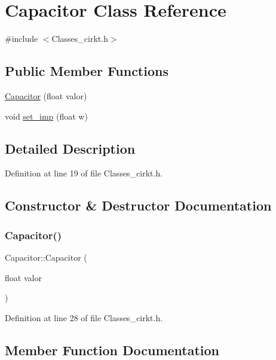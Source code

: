 \hypertarget{class_capacitor}{}\section{Capacitor Class Reference}
\label{class_capacitor}


{\ttfamily \#include $<$Classes\+\_\+cirkt.\+h$>$}

\subsection*{Public Member Functions}
\begin{DoxyCompactItemize}
\item 
\mbox{\hyperlink{class_capacitor_aedcd2e6ce4a36341c227730c49e6bd9a}{Capacitor}} (float valor)
\item 
void \mbox{\hyperlink{class_capacitor_a8a7b6a7f3735d80592111a96e590a771}{set\+\_\+imp}} (float w)
\end{DoxyCompactItemize}


\subsection{Detailed Description}


Definition at line 19 of file Classes\+\_\+cirkt.\+h.



\subsection{Constructor \& Destructor Documentation}
\mbox{\label{class_capacitor_aedcd2e6ce4a36341c227730c49e6bd9a}} 
\subsubsection{\texorpdfstring{Capacitor()}{Capacitor()}}
{\footnotesize\ttfamily Capacitor\+::\+Capacitor (\begin{DoxyParamCaption}\item[{float}]{valor }\end{DoxyParamCaption})}



Definition at line 28 of file Classes\+\_\+cirkt.\+h.



\subsection{Member Function Documentation}
\mbox{\label{class_capacitor_a8a7b6a7f3735d80592111a96e590a771}} 
